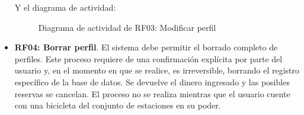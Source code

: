 \begin{itemize}
	\FloatBarrier
	Y el diagrama de actividad:
	\begin{figure}[!htb]
		\centering
		\caption{Diagrama de actividad de RF03: Modificar perfil}
		\label{fig:diagramaActividad_RF03}
	\end{figure}
	
	\FloatBarrier
	\item \textbf{RF04: Borrar perfil}. El sistema debe permitir el borrado completo de perfiles. Este proceso requiere de una confirmación explícita por parte del usuario y, en el momento en que se realice, es irreversible, borrando el registro específico de la base de datos. Se devuelve el dinero ingresado y las posibles reservas se cancelan. El proceso no se realiza mientras que el usuario cuente con una bicicleta del conjunto de estaciones en su poder.
	

\end{itemize}
